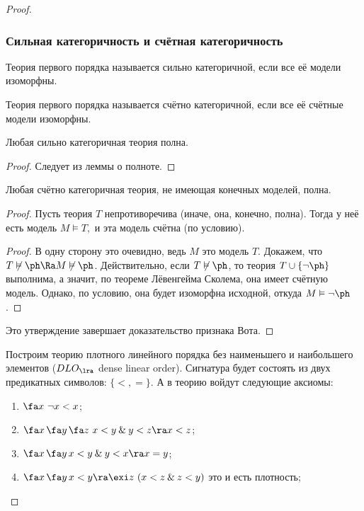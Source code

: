\documentclass[a4paper,draft]{article}
\let\amper\&
\def\&{\mathbin{\amper}}
\def\exis#1{\exi#1\,}
\def\fora#1{\fa#1\,}
\begin{document}
\begin{proof}
\subsubsection{Сильная категоричность и счётная категоричность}
\begin{df}
Теория первого порядка называется сильно категоричной, если все её модели изоморфны.
\end{df}
\begin{df}
Теория первого порядка называется счётно категоричной, если все её счётные модели изоморфны.
\end{df}
\begin{stm}
Любая сильно категоричная теория полна.
\end{stm}
\begin{proof}
Следует из леммы о полноте.
\end{proof}
\begin{stm}
Любая счётно категоричная теория, не имеющая конечных моделей, полна.
\end{stm}
\begin{proof}
Пусть теория $T$ непротиворечива (иначе, она, конечно, полна). Тогда у неё есть модель $M\vDash T,$ и эта модель счётна (по условию).
\begin{stm}
\end{stm}
\begin{proof}
В одну сторону это очевидно, ведь $M$ это модель $T$.
Докажем, что $T\not\vDash\ph\Ra M\not\vDash\ph$.
Действительно, если $T\not\vDash\ph$, то теория $T\cup\{\neg\ph\}$ выполнима,
а значит, по теореме Лёвенгейма Сколема, она имеет счётную модель. Однако, по условию,
она будет изоморфна исходной, откуда $M\vDash\neg\ph$.
\end{proof}
Это утверждение завершает доказательство признака Вота.
\end{proof}
\begin{ex}
Построим теорию плотного линейного порядка без наименьшего и наибольшего элементов ($DLO_{\lra}$ dense linear order).
Сигнатура будет состоять из двух предикатных символов: $\{<,=\}.$ А в теорию войдут следующие аксиомы:
\begin{enumerate}
  \item $\fora x\,\neg x<x$;
  \item $\fora x\fora y\fora z\, x<y\&y<z\ra x<z$;
  \item $\fora x\fora y x<y\&y<x\ra x=y$;
  \item $\fora x\fora y x<y\ra \exis z\,(x<z\&z<y)$ это и есть плотность;

\end{enumerate}
\end{ex}
\end{proof}
\end{document}
